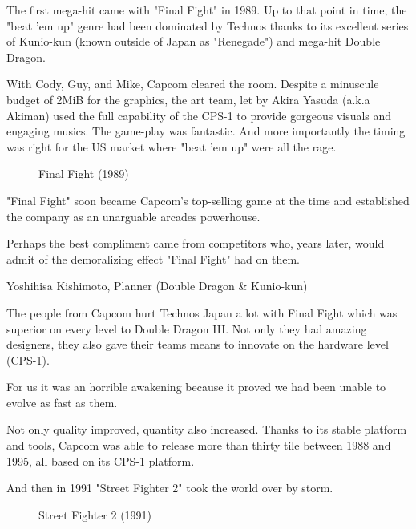 The first mega-hit came with "Final Fight" in 1989. Up to that point in time, the "beat 'em up" genre had been dominated by Technos thanks to its excellent series of Kunio-kun (known outside of Japan as "Renegade") and mega-hit Double Dragon. 

With Cody, Guy, and Mike, Capcom cleared the room. Despite a minuscule budget of 2MiB for the graphics, the art team, let by Akira Yasuda (a.k.a Akiman) used the full capability of the CPS-1 to provide gorgeous visuals and engaging musics. The game-play was fantastic. And more importantly the timing was right for the US market where "beat 'em up" were all the rage.



  

\label{nin_ff}
 \begin{figure}[H]
\caption*{Final Fight (1989)}
\end{figure}

"Final Fight" soon became Capcom's top-selling game at the time\cite{birth_of_chunli} and established the company as an unarguable arcades powerhouse.

\pagebreak

Perhaps the best compliment came from competitors who, years later, would admit of the demoralizing effect "Final Fight" had on them.

\begin{q}{Yoshihisa Kishimoto, Planner (Double Dragon \& Kunio-kun)\cite{dd} }
  

  The people from Capcom hurt Technos Japan a lot with Final Fight which was superior on every level to Double Dragon III. Not only they had amazing designers, they also gave their teams means to innovate on the hardware level (CPS-1). 

  For us it was an horrible awakening because it proved we had been unable to evolve as fast as them.
  \end{q}



Not only quality improved, quantity also increased. Thanks to its stable platform and tools, Capcom was able to release more than thirty tile between 1988 and 1995, all based on its CPS-1 platform. 

And then in 1991 "Street Fighter 2" took the world over by storm.

\label{nin_sf2}
\begin{figure}[H]
\caption*{Street Fighter 2 (1991)}
\end{figure}

